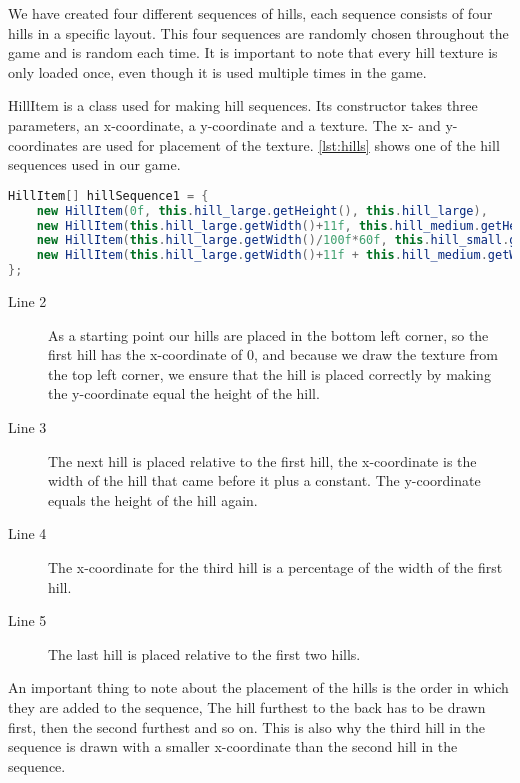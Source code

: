 We have created four different sequences of hills, each sequence consists of four hills in a specific layout. This four sequences are randomly chosen throughout the game and is random each time. It is important to note that every hill texture is only loaded once, even though it is used multiple times in the game. 

HillItem is a class used for making hill sequences. Its constructor takes three parameters, an x-coordinate, a y-coordinate and a texture. The x- and y-coordinates are used for placement of the texture. \autoref{lst:hills} shows one of the hill sequences used in our game.

\begin{lstlisting}[language=java,firstnumber=1,caption={Hill sequence.},label=lst:hills]
HillItem[] hillSequence1 = {
    new HillItem(0f, this.hill_large.getHeight(), this.hill_large),
    new HillItem(this.hill_large.getWidth()+11f, this.hill_medium.getHeight(), this.hill_medium),
    new HillItem(this.hill_large.getWidth()/100f*60f, this.hill_small.getHeight(), this.hill_small),
    new HillItem(this.hill_large.getWidth()+11f + this.hill_medium.getWidth()/100f*65f, this.hill_larger.getHeight(), this.hill_larger)
};
\end{lstlisting}

\begin{description}
\item[Line 2] As a starting point our hills are placed in the bottom left corner, so the first hill has the x-coordinate of 0, and because we draw the texture from the top left corner, we ensure that the hill is placed correctly by making the y-coordinate equal the height of the hill. 
\item[Line 3] The next hill is placed relative to the first hill, the x-coordinate is the width of the hill that came before it plus a constant. The y-coordinate equals the height of the hill again.
\item[Line 4] The x-coordinate for the third hill is a percentage of the width of the first hill. 
\item[Line 5] The last hill is placed relative to the first two hills.
\end{description}

An important thing to note about the placement of the hills is the order in which they are added to the sequence, The hill furthest to the back has to be drawn first, then the second furthest and so on. This is also why the third hill in the sequence is drawn with a smaller x-coordinate than the second hill in the sequence.

